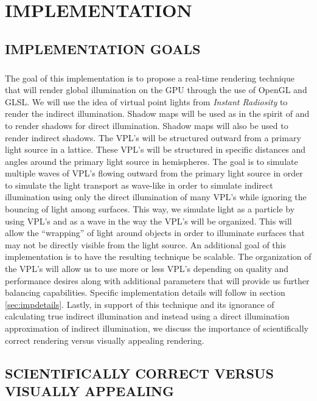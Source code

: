 \chapter{IMPLEMENTATION}

\section{IMPLEMENTATION GOALS} \label{sec:impgoals}
\paragraph{}
The goal of this implementation is to propose a real-time rendering technique that will render global illumination on the GPU through the use of OpenGL and GLSL.  We will use the idea of virtual point lights from \textit{Instant Radiosity} \cite{Keller1997} to render the indirect illumination.  Shadow maps will be used as in the spirit of \cite{Williams1978} and \cite{Reeves1987} to render shadows for direct illumination.  Shadow maps will also be used to render indirect shadows.  The VPL's will be structured outward from a primary light source in a lattice.  These VPL's will be structured in specific distances and angles around the primary light source in hemispheres. The goal is to simulate multiple waves of VPL's flowing outward from the primary light source in order to simulate the light transport as wave-like in order to simulate indirect illumination using only the direct illumination of many VPL's while ignoring the bouncing of light among surfaces.  This way, we simulate light as a particle by using VPL's and as a wave in the way the VPL's will be organized.  This will allow the “wrapping” of light around objects in order to illuminate surfaces that may not be directly visible from the light source.  An additional goal of this implementation is to have the resulting technique be scalable.  The organization of the VPL's will allow us to use more or less VPL's depending on quality and performance desires along with additional parameters that will provide us further balancing capabilities.  Specific implementation details will follow in section \ref{sec:impdetails}.  Lastly, in support of this technique and its ignorance of calculating true indirect illumination and instead using a direct illumination approximation of indirect illumination, we discuss the importance of scientifically correct rendering versus visually appealing rendering.

\section{SCIENTIFICALLY CORRECT VERSUS VISUALLY APPEALING} \label{sec:study}

